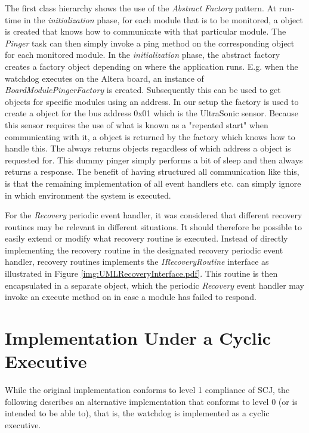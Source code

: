 The first class hierarchy shows the use of the \textit{Abstract Factory} pattern. At run-time in the \textit{initialization} phase, for each module that is to be monitored, a  object is created that knows how to communicate with that particular module. The \textit{Pinger} task can then simply invoke a ping method on the corresponding  object for each monitored module. In the \textit{initialization} phase, the abstract factory creates a factory object depending on where the application runs. E.g. when the watchdog executes on the Altera board, an instance of \emph{BoardModulePingerFactory} is created. Subsequently this can be used to get  objects for specific modules using an \iic address. In our setup the factory is used to create a  object for the \iic bus address 0x01 which is the UltraSonic sensor. Because this sensor requires the use of what is known as a "repeated start" when communicating with it, a  object is returned by the factory which knows how to handle this.
The  always returns   objects regardless of which \iic address a  object is requested for. This dummy pinger simply performs a bit of sleep and then always returns a response. The benefit of having structured all communication like this, is that the remaining implementation of all event handlers etc. can simply ignore in which environment the system is executed.

For the \textit{Recovery} periodic event handler, it was considered that different recovery routines may be relevant in different situations. It should therefore be possible to easily extend or modify what recovery routine is executed. Instead of directly implementing the recovery routine in the designated recovery periodic event handler, recovery routines implements the \emph{IRecoveryRoutine} interface as illustrated in Figure \ref{img:UMLRecoveryInterface.pdf}. This routine is then encapsulated in a separate object, which the periodic \textit{Recovery} event handler may invoke an execute method on in case a module has failed to respond.


\section{Implementation Under a Cyclic Executive} %
\label{sec:implementing_the_watchdog_as_a_cyclic_executive}
While the original implementation conforms to level 1 compliance of SCJ, the following describes an alternative implementation that conforms to level 0 (or is intended to be able to), that is, the watchdog is implemented as a cyclic executive.

